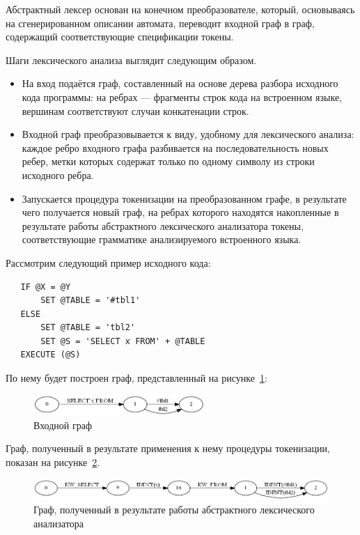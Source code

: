 Абстрактный лексер основан на конечном преобразователе, который, 
основываясь на сгенерированном описании автомата, переводит 
входной граф в граф, содержащий соответствующие спецификации токены. 

Шаги лексического анализа выглядит следующим образом.
\begin{itemize}
    \item На вход подаётся граф, составленный на основе дерева разбора исходного 
    кода программы: на ребрах --- фрагменты строк кода на встроенном языке, 
    вершинам соответствуют случаи конкатенации строк.
    \item Входной граф преобразовывается к виду, удобному для лексического 
    анализа: каждое ребро входного графа разбивается на последовательность новых 
    ребер, метки которых содержат только по одному символу из строки исходного 
    ребра.
    \item Запускается процедура токенизации на преобразованном графе, в 
    результате чего получается новый граф, на ребрах которого находятся 
    накопленные в результате работы абстрактного лексического анализатора 
    токены, соответствующие грамматике анализируемого встроенного языка.
\end{itemize}

Рассмотрим следующий пример исходного кода:

\begin{verbatim}
   IF @X = @Y
       SET @TABLE = '#tbl1'
   ELSE
       SET @TABLE = 'tbl2'
       SET @S = 'SELECT x FROM' + @TABLE
   EXECUTE (@S)
\end{verbatim}

По нему будет построен граф, представленный на рисунке~\ref{SimpleSql}:
\begin{figure}[h]
 \label{SimpleSql}
 \centering
 \includegraphics[width=6.5cm]{Verbitskaya/SimpleSql.png}
 \caption{Входной граф}
\end{figure}

Граф, полученный в результате применения к нему процедуры токенизации,  
показан на рисунке~\ref{SimpleSqlLex}.

\begin{figure}[h]
 \label{SimpleSqlLex}
 \centering
 \includegraphics[width=12cm]{Verbitskaya/SimpleSql_lex.png}
 \caption{Граф, полученный в результате работы абстрактного лексического анализатора}
\end{figure}

